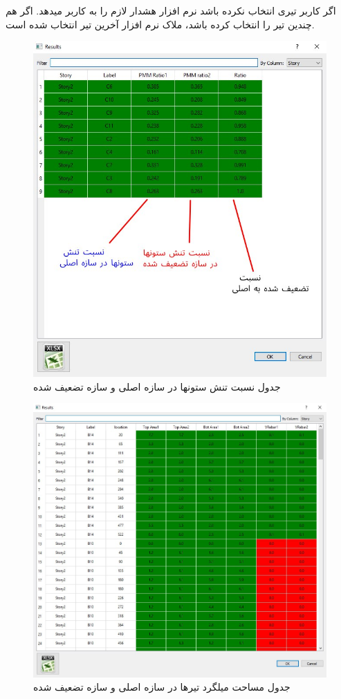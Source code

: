 اگر کاربر تیری انتخاب نکرده باشد نرم افزار هشدار لازم را به کاربر میدهد. اگر هم چندین تیر را انتخاب کرده باشد، ملاک نرم افزار آخرین تیر انتخاب شده است.

\begin{figure}[H]
    \centering
    \includegraphics[scale=.7]{figures/weakness_column}
    \caption{جدول نسبت تنش ستونها در سازه اصلی و سازه تضعیف شده}
    \label{pic:weakness_column}
\end{figure}

\begin{figure}[H]
    \centering
    \includegraphics[scale=.6]{figures/weakness_beam}
    \caption{جدول مساحت میلگرد تیرها در سازه اصلی و سازه تضعیف شده}
    \label{pic:weakness_beam}
\end{figure}

